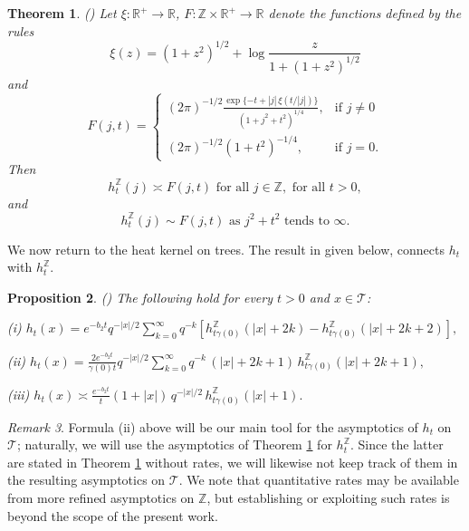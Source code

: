 \documentclass[11pt,a4paper,reqno]{amsart}
\renewcommand\mathcal{\mathscr}
\theoremstyle{plain}
\newtheorem{theorem}{Theorem}[section]
\newtheorem{proposition}[theorem]{Proposition}
\theoremstyle{remark}
\newtheorem{remark}[theorem]{Remark}
\theoremstyle{definition}
\theoremstyle{remark}
\numberwithin{equation}{section}
\begin{document}
	\begin{theorem}\label{thm:heat Z asym}(\cite[Theorem 2.3]{CMS})
		Let $\xi:\mathbb{R}^{+}\to \mathbb{R}$, $F:\mathbb{Z}\times \mathbb{R}^{+}\to \mathbb{R}$ denote the functions defined by the rules 
		$$\xi(z)=(1+z^2)^{1/2}+\log \frac{z}{1+(1+z^2)^{1/2}}$$
		and 
		$$F(j,t)=\begin{cases}
			(2\pi)^{-1/2}\frac{\exp\{-t+|j|\,\xi(t/|j|)\}}{(1+j^2+t^2)^{1/4}}, & \text{if } j\neq 0\\
			(2\pi)^{-1/2}(1+t^2)^{-1/4}, & \text{if } j=0.
		\end{cases}$$
		Then 
		$$h_t^{\mathbb{Z}}(j)\asymp F(j,t) \text{ for all } j\in \mathbb{Z}, \text{ for all } t>0,$$ and 
		$$h_t^{\mathbb{Z}}(j)\sim F(j,t) \text{ as } j^2+t^2 \text{ tends to } \infty.$$
	\end{theorem}
	
	
	
	
	We now return to the heat kernel on trees. The result in \cite{CMS} given below, connects $h_t$ with $h_t^{\mathbb{Z}}$.
	\begin{proposition}\label{heatkernel}(\cite[Proposition 2.5]{CMS})
		The following hold for every $t>0$ and $x\in \mathcal{T}$:
		
		(i) $h_t(x)=e^{-b_2t}q^{-|x|/2}\sum_{k=0}^{\infty}q^{-k}\left[h_{t\gamma(0)}^{\mathbb{Z}}(|x|+2k)-h_{t\gamma(0)}^{\mathbb{Z}}(|x|+2k+2)  \right],$
		
		(ii) $h_t(x)=\frac{2e^{-b_2t}}{\gamma(0)t}q^{-|x|/2}\sum_{k=0}^{\infty}q^{-k}\,(|x|+2k+1)\,h_{t\gamma(0)}^{\mathbb{Z}}(|x|+2k+1),$
		
		(iii) $h_t(x)\asymp \frac{e^{-b_2t}}{t}(1+|x|)\,q^{-|x|/2}\,h_{t\gamma(0)}^{\mathbb{Z}}(|x|+1).$
	\end{proposition}
\begin{remark}
    Formula (ii) above will be our main tool for the asymptotics of $h_t$ on $\mathcal{T}$; naturally, we will use the asymptotics of Theorem \ref{thm:heat Z asym} for $h_t^{\mathbb{Z}}$. Since the latter are stated in Theorem \ref{thm:heat Z asym} without rates, we will likewise not keep track of them in the resulting asymptotics on $\mathcal{T}$. We note that quantitative rates may be available from more refined asymptotics on $\mathbb{Z}$, but establishing or exploiting such rates is beyond the scope of the present work.
\end{remark}
    
\end{document}
